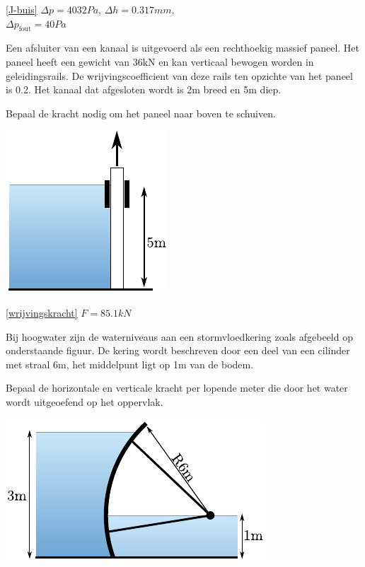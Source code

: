 \begin{antwoord}{\ref{J-buis}}
	$\Delta p = 4032\unit{Pa}$, $\Delta h = 0.317\unit{mm}$,\\ $\Delta p_{\text{fout}} = 40\unit{Pa}$
\end{antwoord}
\begin{toepassing}[*]
	\label{wrijvingskracht}
Een afsluiter van een kanaal is uitgevoerd als een rechthoekig massief paneel. Het paneel heeft een gewicht van 36kN en kan verticaal bewogen worden in geleidingsrails. De wrijvingscoefficient van deze rails ten opzichte van het paneel is 0.2. Het kanaal dat afgesloten wordt is 2m breed en 5m diep.
		
Bepaal de kracht nodig om het paneel naar boven te schuiven.

	\centering
	\includegraphics{fig/hydrostatica/wrijvingskracht}
\end{toepassing}
\begin{antwoord}{\ref{wrijvingskracht}}
	$F = 85.1\unit{kN}$
\end{antwoord}
\begin{toepassing}[*]
	\label{stormvloedkering}
Bij hoogwater zijn de waterniveaus aan een stormvloedkering zoals afgebeeld op onderstaande figuur. De kering wordt beschreven door een deel van een cilinder met straal 6m, het middelpunt ligt op 1m van de bodem.
		
Bepaal de horizontale en verticale kracht per lopende meter die door het water wordt uitgeoefend op het oppervlak.

	\centering
	\includegraphics{fig/hydrostatica/stormvloedkering}
\end{toepassing}

